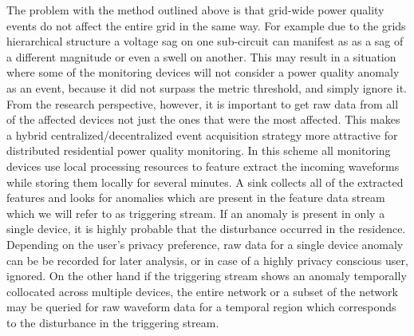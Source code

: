 The problem with the method outlined above is that grid-wide power quality events do not affect the entire grid in the same way.
For example due to the grids hierarchical structure a voltage sag on one sub-circuit can manifest as as a sag of a different magnitude or even a swell on another.\cite{kahle2016power} This may result in a situation where some of the monitoring devices will not consider a power quality anomaly as an event, because it did not surpass the metric threshold, and simply ignore it.
From the research perspective, however, it is important to get raw data from all of the affected devices not just the ones that were the most affected.
This makes a hybrid centralized/decentralized event acquisition strategy more attractive for distributed residential power quality monitoring.
In this scheme all monitoring devices use local processing resources to feature extract the incoming waveforms while storing them locally for several minutes.
A sink collects all of the extracted features and looks for anomalies which are present in the feature data stream which we will refer to as triggering stream.
If an anomaly is present in only a single device, it is highly probable that the disturbance occurred in the residence.
Depending on the user's privacy preference, raw data for a single device anomaly can be be recorded for later analysis, or in case of a highly privacy conscious user, ignored.
On the other hand if the triggering stream shows an anomaly temporally collocated across multiple devices, the entire network or a subset of the network may be queried for raw waveform data for a temporal region which corresponds to the disturbance in the triggering stream.

